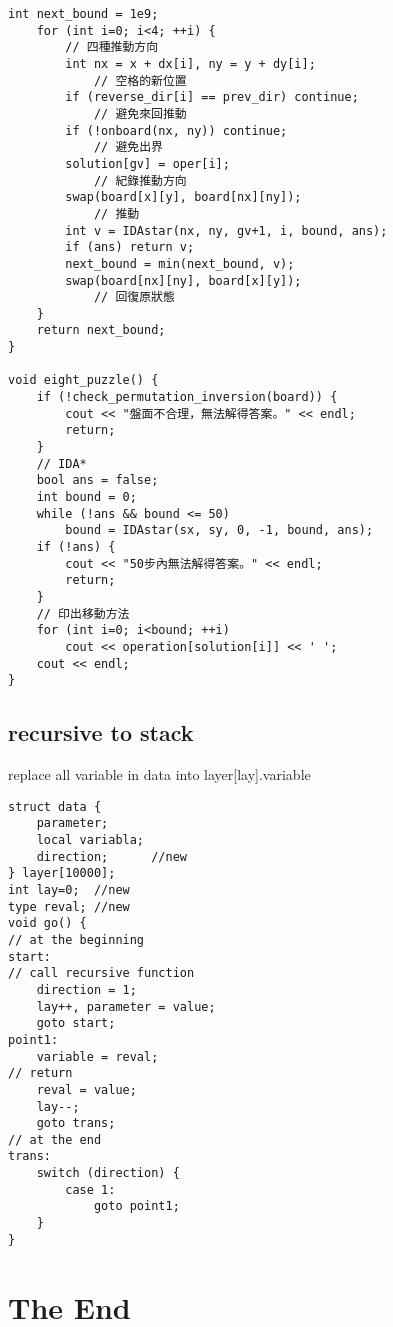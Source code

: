 \documentclass[11pt,twocolumn,a4paper]{article}
\begin{document}
\begin{lstlisting}[label=8 puzzle - IDA*]
	int next_bound = 1e9;
	for (int i=0; i<4; ++i) {
		// 四種推動方向
		int nx = x + dx[i], ny = y + dy[i];
			// 空格的新位置
		if (reverse_dir[i] == prev_dir) continue;
			// 避免來回推動
		if (!onboard(nx, ny)) continue;
			// 避免出界
		solution[gv] = oper[i];
			// 紀錄推動方向
		swap(board[x][y], board[nx][ny]);
			// 推動
		int v = IDAstar(nx, ny, gv+1, i, bound, ans);
		if (ans) return v;
		next_bound = min(next_bound, v);
		swap(board[nx][ny], board[x][y]);
			// 回復原狀態
	}
	return next_bound;
}
 
void eight_puzzle() {
	if (!check_permutation_inversion(board)) {
		cout << "盤面不合理，無法解得答案。" << endl;
		return;
	}
	// IDA*
	bool ans = false;
	int bound = 0;
	while (!ans && bound <= 50)
		bound = IDAstar(sx, sy, 0, -1, bound, ans);
	if (!ans) {
		cout << "50步內無法解得答案。" << endl;
		return;
	}
	// 印出移動方法
	for (int i=0; i<bound; ++i)
		cout << operation[solution[i]] << ' ';
	cout << endl;
}
\end{lstlisting}
\subsection{recursive to stack}
replace all variable in data into layer[lay].variable
\begin{lstlisting}[label=recursive to stack]
struct data {
	parameter;
	local variabla;
	direction;		//new
} layer[10000];
int lay=0;	//new
type reval;	//new
void go() {
// at the beginning
start:
// call recursive function	
	direction = 1;
	lay++, parameter = value;
	goto start;
point1:
	variable = reval;
// return
	reval = value;
	lay--;
	goto trans;
// at the end
trans:
	switch (direction) {
		case 1:
			goto point1;
	}
}
\end{lstlisting}
\section*{The End}
\end{document}
